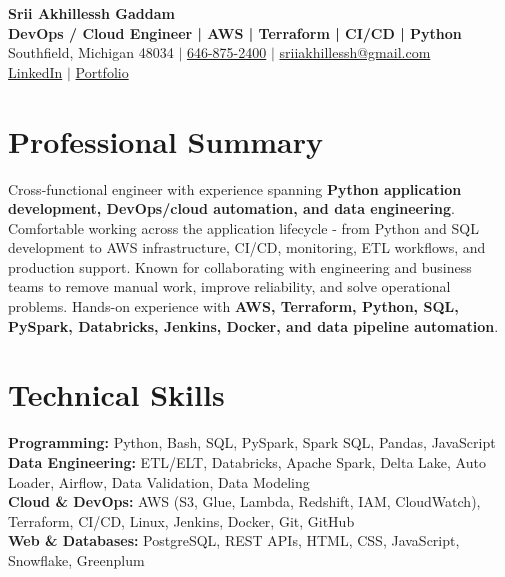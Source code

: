 \documentclass[letterpaper,10pt]{article}
\begin{document}
\fontsize{9.35pt}{10.45pt}\selectfont

\begin{center}
    {\LARGE \textbf{Srii Akhillessh Gaddam}} \\[-1pt]
    \textbf{DevOps / Cloud Engineer | AWS | Terraform | CI/CD | Python} \\[2pt]
    Southfield, Michigan 48034 $|$
    \href{tel:6468752400}{646-875-2400} $|$
    \href{mailto:sriiakhillessh@gmail.com}{sriiakhillessh@gmail.com} \\[1pt]
    \href{https://www.linkedin.com/in/srii-akhiilessh-gaddam-b48668191/}{LinkedIn} $|$
    \href{https://sriiakhillesshg.github.io/portfolio/}{Portfolio}
\end{center}
\vspace{-8pt}

\section{Professional Summary}
\small{Cross-functional engineer with experience spanning \textbf{Python application development, DevOps/cloud automation, and data engineering}. Comfortable working across the application lifecycle - from Python and SQL development to AWS infrastructure, CI/CD, monitoring, ETL workflows, and production support. Known for collaborating with engineering and business teams to remove manual work, improve reliability, and solve operational problems. Hands-on experience with \textbf{AWS, Terraform, Python, SQL, PySpark, Databricks, Jenkins, Docker, and data pipeline automation}.}

\section{Technical Skills}
\small{
\textbf{Programming:} Python, Bash, SQL, PySpark, Spark SQL, Pandas, JavaScript \\
\textbf{Data Engineering:} ETL/ELT, Databricks, Apache Spark, Delta Lake, Auto Loader, Airflow, Data Validation, Data Modeling \\
\textbf{Cloud \& DevOps:} AWS (S3, Glue, Lambda, Redshift, IAM, CloudWatch), Terraform, CI/CD, Linux, Jenkins, Docker, Git, GitHub \\
\textbf{Web \& Databases:} PostgreSQL, REST APIs, HTML, CSS, JavaScript, Snowflake, Greenplum
}
\end{document}
